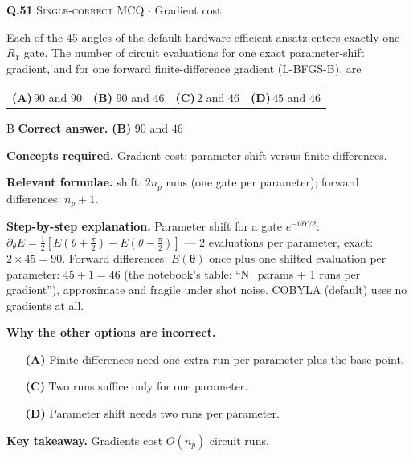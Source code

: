 \documentclass[11pt,a4paper]{article}
\newcommand{\optlabel}[1]{\textbf{(#1)}}
\newcommand{\correctlabel}[1]{\textcolor{okgreen}{\textbf{(#1)}\,\ding{51}}}
\newenvironment{qitem}[1]{\begin{list}{}{\setlength{\leftmargin}{3.3em}\setlength{\labelwidth}{3.1em}%
  \setlength{\labelsep}{0.2em}\setlength{\topsep}{3pt}\setlength{\parsep}{3pt}}\item[\textbf{Q.#1}\hfill]}{\end{list}}
\newcommand{\qsep}{\par\vspace{2pt}{\color{black!15}\hrule}\vspace{4pt}}
\newcommand{\qmeta}[2]{{\footnotesize\color{black!60}\textsc{#1} \;$\cdot$\; #2}\par}
\begin{document}
\begin{qitem}{51}
\qmeta{Single-correct MCQ}{Gradient cost}
Each of the 45 angles of the default hardware-efficient ansatz enters exactly one $R_Y$ gate. The number of circuit evaluations for one exact
parameter-shift gradient, and for one forward finite-difference gradient (L-BFGS-B), are
\par\smallskip\noindent\begin{tabularx}{\linewidth}{@{}*{4}{L}@{}}
\optlabel{A}\,$90$ and $90$ & \correctlabel{B}\,$90$ and $46$ & \optlabel{C}\,$2$ and $46$ & \optlabel{D}\,$45$ and $46$
\end{tabularx}
\end{qitem}
\begin{solbox}{B}
\textbf{\color{brand}Correct answer.} \textcolor{okgreen}{\textbf{(B)}} $90$ and $46$

\textbf{\color{brand}Concepts required.} Gradient cost: parameter shift versus finite differences.

\textbf{\color{brand}Relevant formulae.} shift: $2n_p$ runs (one gate per parameter); forward differences: $n_p + 1$.

\textbf{\color{brand}Step-by-step explanation.} Parameter shift for a gate $e^{-i\theta Y/2}$: $\partial_\theta E = \tfrac12[E(\theta + \tfrac\pi2) - E(\theta - \tfrac\pi2)]$ --- 2 evaluations per parameter, exact: $2\times45 = 90$.
Forward differences: $E(\boldsymbol\theta)$ once plus one shifted evaluation per parameter: $45 + 1 = 46$ (the notebook's table: ``N\_params + 1
runs per gradient''), approximate and fragile under shot noise. COBYLA (default) uses no gradients at all.

\textbf{\color{brand}Why the other options are incorrect.}
\begin{itemize}[leftmargin=2.4em, itemsep=1pt, topsep=2pt]
\item[\textbf{(A)}] Finite differences need one extra run per parameter plus the base point.
\item[\textbf{(C)}] Two runs suffice only for one parameter.
\item[\textbf{(D)}] Parameter shift needs two runs per parameter.
\end{itemize}
\textbf{\color{brand}Key takeaway.} Gradients cost $O(n_p)$ circuit runs.
\end{solbox}
\qsep
\end{document}
